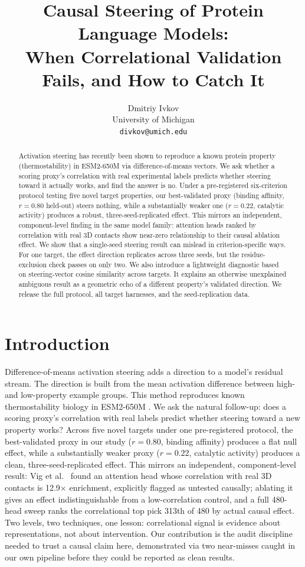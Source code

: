\documentclass{article}
\title{Causal Steering of Protein Language Models: \\
When Correlational Validation Fails, and How to Catch It}
\author{%
  Dmitriy Ivkov \\
  University of Michigan \\
  \texttt{divkov@umich.edu}
}
\begin{document}
\maketitle

\begin{abstract}
Activation steering has recently been shown to reproduce a known protein
property (thermostability) in ESM2-650M via difference-of-means vectors.
We ask whether a scoring proxy's correlation with real experimental
labels predicts whether steering toward it actually works, and find the
answer is no. Under a pre-registered six-criterion protocol testing five
novel target properties, our best-validated proxy (binding affinity,
$r=0.80$ held-out) steers nothing, while a substantially weaker one
($r=0.22$, catalytic activity) produces a robust, three-seed-replicated
effect. This mirrors an independent, component-level finding in the same
model family: attention heads ranked by correlation with real 3D
contacts show near-zero relationship to their causal ablation effect. We
show that a single-seed steering result can mislead in
criterion-specific ways. For one target, the effect direction replicates
across three seeds, but the residue-exclusion check passes on only two.
We also introduce a lightweight diagnostic based on steering-vector
cosine similarity across targets. It explains an otherwise unexplained
ambiguous result as a geometric echo of a different property's validated
direction. We release the full protocol, all target harnesses, and the
seed-replication data.
\end{abstract}

\section{Introduction}

Difference-of-means activation steering adds a direction to a model's
residual stream. The direction is built from the mean activation
difference between high- and low-property example groups. This method
reproduces known thermostability biology in ESM2-650M
\citep{huang2025steering}. We ask the natural follow-up: does a scoring
proxy's correlation with real labels predict whether steering toward a
new property works? Across five novel targets under one
pre-registered protocol, the best-validated proxy in our study ($r=0.80$,
binding affinity) produces a flat null effect, while a substantially
weaker proxy ($r=0.22$, catalytic activity) produces a clean,
three-seed-replicated effect. This mirrors an independent,
component-level result: Vig et al.\ \citep{vig2021bertology} found an
attention head whose correlation with real 3D contacts is 12.9$\times$
enrichment, explicitly flagged as untested causally; ablating it gives an
effect indistinguishable from a low-correlation control, and a full
480-head sweep ranks the correlational top pick 313th of 480 by actual
causal effect. Two levels, two techniques, one lesson: correlational
signal is evidence about representations, not about intervention. Our
contribution is the audit discipline needed to trust a causal claim
here, demonstrated via two near-misses caught in our own pipeline before
they could be reported as clean results.
\end{document}
